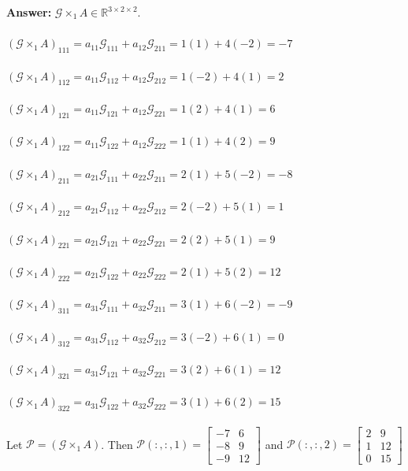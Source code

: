 \documentclass[12pt]{article}
\begin{document}
\bigskip
\noindent\textbf{Answer:} $\mathcal{G} \times_{1} A\in\mathbb{R}^{3\times 2\times 2}$. 
\\~\\$\left(\mathcal{G} \times_{1} A\right)_{111}=a_{11}\mathcal{G}_{111}+a_{12}\mathcal{G}_{211}=1(1)+4(-2)=-7$
\\~\\$\left(\mathcal{G} \times_{1} A\right)_{112}=a_{11}\mathcal{G}_{112}+a_{12}\mathcal{G}_{212}=1(-2)+4(1)=2$
\\~\\$\left(\mathcal{G} \times_{1} A\right)_{121}=a_{11}\mathcal{G}_{121}+a_{12}\mathcal{G}_{221}=1(2)+4(1)=6$
\\~\\$\left(\mathcal{G} \times_{1} A\right)_{122}=a_{11}\mathcal{G}_{122}+a_{12}\mathcal{G}_{222}=1(1)+4(2)=9$
\\~\\$\left(\mathcal{G} \times_{1} A\right)_{211}=a_{21}\mathcal{G}_{111}+a_{22}\mathcal{G}_{211}=2(1)+5(-2)=-8$
\\~\\$\left(\mathcal{G} \times_{1} A\right)_{212}=a_{21}\mathcal{G}_{112}+a_{22}\mathcal{G}_{212}=2(-2)+5(1)=1$
\\~\\$\left(\mathcal{G} \times_{1} A\right)_{221}=a_{21}\mathcal{G}_{121}+a_{22}\mathcal{G}_{221}=2(2)+5(1)=9$
\\~\\$\left(\mathcal{G} \times_{1} A\right)_{222}=a_{21}\mathcal{G}_{122}+a_{22}\mathcal{G}_{222}=2(1)+5(2)=12$
\\~\\$\left(\mathcal{G} \times_{1} A\right)_{311}=a_{31}\mathcal{G}_{111}+a_{32}\mathcal{G}_{211}=3(1)+6(-2)=-9$
\\~\\$\left(\mathcal{G} \times_{1} A\right)_{312}=a_{31}\mathcal{G}_{112}+a_{32}\mathcal{G}_{212}=3(-2)+6(1)=0$
\\~\\$\left(\mathcal{G} \times_{1} A\right)_{321}=a_{31}\mathcal{G}_{121}+a_{32}\mathcal{G}_{221}=3(2)+6(1)=12$
\\~\\$\left(\mathcal{G} \times_{1} A\right)_{322}=a_{31}\mathcal{G}_{122}+a_{32}\mathcal{G}_{222}=3(1)+6(2)=15$
\\~\\Let $\mathcal{P}=\left(\mathcal{G} \times_{1} A\right)$. Then $\mathcal{P}\left(:, :, 1\right)=\left[\begin{array}{cc}{-7} & {6} \\ {-8} & {9} \\ {-9} & {12}\end{array}\right]$ and $\mathcal{P}\left(:, :, 2\right)=\left[\begin{array}{cc}{2} & {9} \\ {1} & {12} \\ {0} & {15}\end{array}\right]$ 
\end{document}
